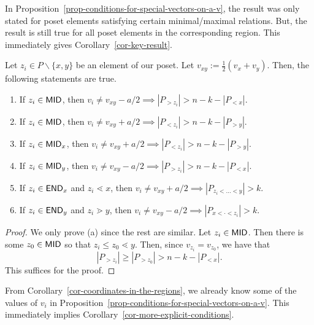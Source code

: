 \documentclass{puthesis-UG}
\begin{document}
In Proposition~\ref{prop-conditions-for-special-vectors-on-a-v}, the result was only stated for poset elements satisfying certain minimal/maximal relations. But, the result is still true for all poset elements in the corresponding region. This immediately gives Corollary~\ref{cor-key-result}. 

\begin{cor} \label{cor-key-result}
	Let $z_i \in P \backslash \{x, y\}$ be an element of our poset. Let $v_{xy} := \frac{1}{2} (v_x + v_y)$. Then, the following statements are true. 
	\begin{enumerate}[label = (\alph*)]
		\item If $z_i \in \mathsf{MID}$, then $v_i \neq v_{xy} - a/2 \implies |P_{> z_i}| > n-k - |P_{< x}|$. 
		\item If $z_i \in \mathsf{MID}$, then $v_i \neq v_{xy} + a/2 \implies |P_{< z_i}| > n-k-|P_{>y}|$. 
		\item If $z_i \in \mathsf{MID}_x$, then $v_i \neq v_{xy} + a/2 \implies |P_{<z_i}| > n-k-|P_{>y}|$.
		\item If $z_i \in \mathsf{MID}_y$, then $v_i \neq v_{xy} - a/2 \implies |P_{> z_i}| > n-k - |P_{< x}|$. 
		\item If $z_i \in \mathsf{END}_x$ and $z_i \lessdot x$, then $v_i \neq v_{xy} + a/2 \implies |P_{z_i < \ldots < y}| > k$. 
		\item If $z_i \in \mathsf{END}_y$ and $z_i \gtrdot y$, then $v_i \neq v_{xy} - a/2 \implies |P_{x < \cdot < z_i}| > k$.  
	\end{enumerate}
\end{cor}

\begin{proof}
	We only prove (a) since the rest are similar. Let $z_i \in \mathsf{MID}$. Then there is some $z_0 \in \mathsf{MID}$ so that $z_i \leq z_0 \lessdot y$. Then, since $v_{z_i} = v_{z_0}$, we have that 
	\[
		|P_{>z_i}| \geq |P_{>z_0}| > n- k - |P_{< x}|.
	\]
	This suffices for the proof. 
\end{proof}


From Corollary~\ref{cor-coordinates-in-the-regions}, we already know some of the values of $v_i$ in Proposition~\ref{prop-conditions-for-special-vectors-on-a-v}. This immediately implies Corollary~\ref{cor-more-explicit-conditions}. 
\end{document}
